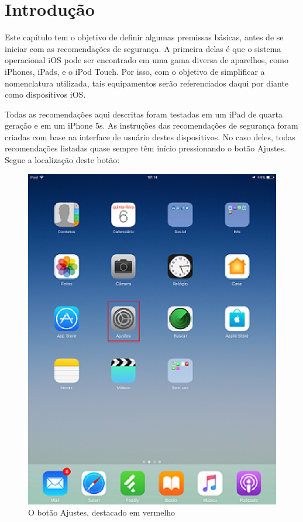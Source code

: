 \chapter{Introdu\c c\~ao}

Este cap\'itulo tem o objetivo de definir algumas premissas b\'asicas, antes de se iniciar com as recomenda\c c\~oes de seguran\c ca. A primeira delas \'e que o sistema operacional iOS pode ser encontrado em uma gama diversa de aparelhos, como iPhones, iPads, e o iPod Touch. Por isso, com o objetivo de simplificar a nomenclatura utilizada, tais equipamentos ser\~ao referenciados daqui por diante como dispositivos iOS. 

Todas as recomenda\c c\~oes aqui descritas foram testadas em um iPad de quarta gera\c c\~ao e em um iPhone 5s. As instru\c c\~oes das recomenda\c c\~oes de seguran\c ca foram criadas com base na interface de usu\'ario destes dispositivos. No caso deles, todas recomenda\c c\~oes listadas quase sempre t\^em in\'icio pressionando o bot\~ao Ajustes. Segue a localiza\c c\~ao deste bot\~ao:

\begin{figure}[h]
  \centering
  \includegraphics{imagem4.eps}
  \caption{O bot\~ao Ajustes, destacado em vermelho}
\end{figure}

